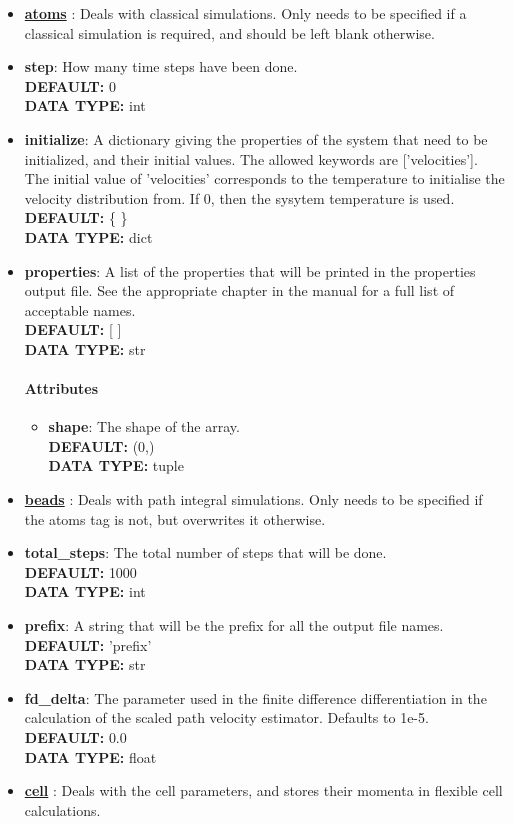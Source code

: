 \begin{itemize}
\item {\bf \hyperref[ATOMS]{atoms} }:
 Deals with classical simulations. Only needs to be specified if a classical simulation is required, and should be left blank otherwise.
\item {\bf step}:
 How many time steps have been done.
{\\ \bf DEFAULT: }0
{\\ \bf DATA TYPE: }int
\item {\bf initialize}:
 A dictionary giving the properties of the system that need to be initialized, and their initial values. The allowed keywords are ['velocities']. The initial value of 'velocities' corresponds to the temperature to initialise the velocity distribution from. If 0, then the sysytem temperature is used.
{\\ \bf DEFAULT: }\{ \}
{\\ \bf DATA TYPE: }dict
\item {\bf properties}:
 A list of the properties that will be printed in the properties output file. See the appropriate chapter in the manual for a full list of acceptable names.
{\\ \bf DEFAULT: }[ ]
{\\ \bf DATA TYPE: }str
\paragraph{Attributes}
 \begin{itemize}
\item {\bf shape}:
 The shape of the array.
{\\ \bf DEFAULT: }(0,)
{\\ \bf DATA TYPE: }tuple
\end{itemize}
 
\item {\bf \hyperref[BEADS]{beads} }:
 Deals with path integral simulations. Only needs to be specified if the atoms tag is not, but overwrites it otherwise.
\item {\bf total\_steps}:
 The total number of steps that will be done.
{\\ \bf DEFAULT: }1000
{\\ \bf DATA TYPE: }int
\item {\bf prefix}:
 A string that will be the prefix for all the output file names.
{\\ \bf DEFAULT: }'prefix'
{\\ \bf DATA TYPE: }str
\item {\bf fd\_delta}:
 The parameter used in the finite difference differentiation in the calculation of the scaled path velocity estimator. Defaults to 1e-5.
{\\ \bf DEFAULT: }0.0
{\\ \bf DATA TYPE: }float
\item {\bf \hyperref[CELL]{cell} }:
 Deals with the cell parameters, and stores their momenta in flexible cell calculations.

\end{itemize}
